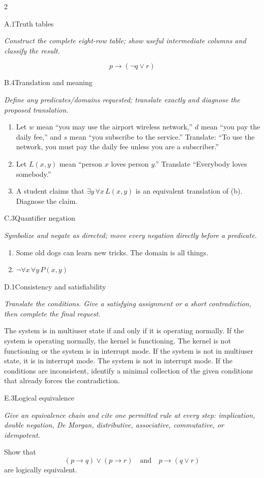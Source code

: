 \documentclass[9pt]{extarticle}
\begin{document}
\begin{multicols}{2}
\begin{CoreProblem}{A.1}{Truth tables}
{\scriptsize\textit{Construct the complete eight-row table; show useful intermediate columns and classify the result.}\par}
\[
  p\to(\neg q\lor r)
\]
\end{CoreProblem}
\begin{CoreProblem}{B.4}{Translation and meaning}
{\scriptsize\textit{Define any predicates/domains requested; translate exactly and diagnose the proposed translation.}\par}
\begin{enumerate}[label=(\alph*)]
  \item Let $w$ mean ``you may use the airport wireless network,'' $d$ mean
        ``you pay the daily fee,'' and $s$ mean ``you subscribe to the
        service.'' Translate: ``To use the network, you must pay the daily fee
        unless you are a subscriber.''
  \item Let $L(x,y)$ mean ``person $x$ loves person $y$.'' Translate
        ``Everybody loves somebody.''
  \item A student claims that $\exists y\,\forall x\,L(x,y)$ is an equivalent
        translation of (b). Diagnose the claim.
\end{enumerate}
\end{CoreProblem}
\begin{CoreProblem}{C.3}{Quantifier negation}
{\scriptsize\textit{Symbolize and negate as directed; move every negation directly before a predicate.}\par}
\begin{enumerate}[label=(\alph*)]
  \item Some old dogs can learn new tricks. The domain is all things.
  \item $\neg\forall x\,\forall y\,P(x,y)$
\end{enumerate}
\end{CoreProblem}
\columnbreak
\begin{CoreProblem}{D.1}{Consistency and satisfiability}
{\scriptsize\textit{Translate the conditions. Give a satisfying assignment or a short contradiction, then complete the final request.}\par}
The system is in multiuser state if and only if it is operating normally. If
the system is operating normally, the kernel is functioning. The kernel is not
functioning or the system is in interrupt mode. If the system is not in
multiuser state, it is in interrupt mode. The system is not in interrupt mode.
If the conditions are inconsistent, identify a minimal collection of the given
conditions that already forces the contradiction.
\end{CoreProblem}
\begin{CoreProblem}{E.3}{Logical equivalence}
{\scriptsize\textit{Give an equivalence chain and cite one permitted rule at every step: implication, double negation, De Morgan, distributive, associative, commutative, or idempotent.}\par}
Show that
\[
  (p\to q)\lor(p\to r)
  \quad\text{and}\quad
  p\to(q\lor r)
\]
are logically equivalent.
\end{CoreProblem}
\end{multicols}
\end{document}
